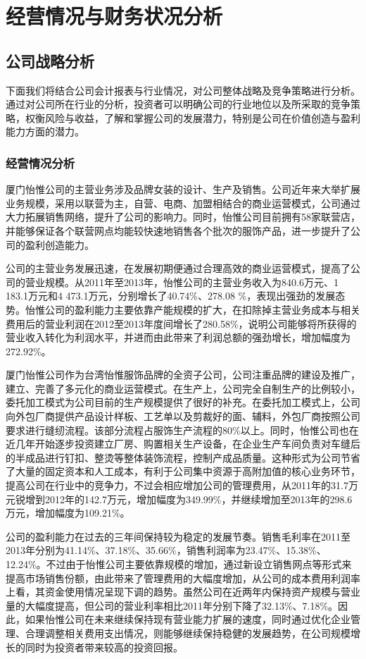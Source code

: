 
\chapter{经营情况与财务状况分析}
\label{chap02}

\section{公司战略分析}

下面我们将结合公司会计报表与行业情况，对公司整体战略及竞争策略进行分析。通过对公司所在行业的分析，投资者可以明确公司的行业地位以及所采取的竞争策略，权衡风险与收益，了解和掌握公司的发展潜力，特别是公司在价值创造与盈利能力方面的潜力。

\subsection{经营情况分析}
厦门怡惟公司的主营业务涉及品牌女装的设计、生产及销售。公司近年来大举扩展业务规模，采用以联营为主，自营、电商、加盟相结合的商业运营模式，公司通过大力拓展销售网络，提升了公司的影响力。同时，怡惟公司目前拥有58家联营店，并能够保证各个联营网点均能较快速地销售各个批次的服饰产品，进一步提升了公司的盈利创造能力。
\begin{compactenum}[(1) ]
\item 公司的主营业务发展迅速，在发展初期便通过合理高效的商业运营模式，提高了公司的营业规模。从2011年至2013年，怡惟公司的主营业务收入为840.6万元、1 183.1万元和4 473.1万元，分别增长了40.74\%、278.08
\%，表现出强劲的发展态势。怡惟公司的盈利能力主要依靠产能规模的扩大，在扣除掉主营业务成本与相关费用后的营业利润在2012至2013年度间增长了280.58\%，说明公司能够将所获得的营业收入转化为利润水平，并进而由此带来了利润总额的强劲增长，增加幅度为272.92\%。
\item 厦门怡惟公司作为台湾怡惟服饰品牌的全资子公司，公司注重品牌的建设及推广，建立、完善了多元化的商业运营模式。在生产上，公司完全自制生产的比例较小，委托加工模式为公司目前的生产规模提供了很好的补充。在委托加工模式上，公司向外包厂商提供产品设计样板、工艺单以及剪裁好的面、辅料，外包厂商按照公司要求进行缝纫流程。该部分流程占服饰生产流程的80\%以上。同时，怡惟公司也在近几年开始逐步投资建立厂房、购置相关生产设备，在企业生产车间负责对车缝后的半成品进行钉扣、整烫等整体装饰流程，控制产成品质量。这种形式为公司节省了大量的固定资本和人工成本，有利于公司集中资源于高附加值的核心业务环节，提高公司在行业中的竞争力，不过会相应增加公司的管理费用，从2011年的31.7万元锐增到2012年的142.7万元，增加幅度为349.99\%，并继续增加至2013年的298.6万元，增加幅度为109.21\%。
\item 公司的盈利能力在过去的三年间保持较为稳定的发展节奏。销售毛利率在2011至2013年分别为41.14\%、37.18\%、35.66\%，销售利润率为23.47\%、15.38\%、12.24\%。不过由于怡惟公司主要依靠规模的增加，通过新设立销售网点等形式来提高市场销售份额，由此带来了管理费用的大幅度增加，从公司的成本费用利润率上看，其资金使用情况呈现下调的趋势。虽然公司在近两年内保持资产规模与营业量的大幅度提高，但公司的营业利率相比2011年分别下降了32.13\%、7.18\%。因此，如果怡惟公司在未来继续保持现有营业能力扩展的速度，同时通过优化企业管理、合理调整相关费用支出情况，则能够继续保持稳健的发展趋势，在公司规模增长的同时为投资者带来较高的投资回报。 
\end{compactenum}

